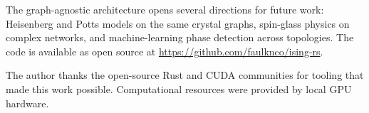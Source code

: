 \documentclass[twocolumn,showpacs,preprintnumbers,amsmath,amssymb,pra,floatfix]{revtex4-2}
\begin{document}
The graph-agnostic architecture opens several directions for future work: Heisenberg
and Potts models on the same crystal graphs, spin-glass physics on complex networks,
and machine-learning phase detection across topologies. The code is available as
open source at \url{https://github.com/faulknco/ising-rs}.

\begin{acknowledgments}
The author thanks the open-source Rust and CUDA communities for tooling
that made this work possible. Computational resources were provided by
local GPU hardware.
\end{acknowledgments}


\end{document}
